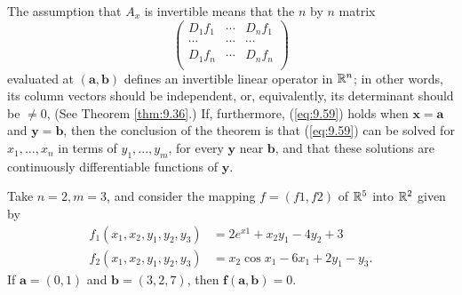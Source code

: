 The assumption that $A_x$ is invertible means that the $n$ by $n$ matrix
\begin{equation*}
    \begin{pmatrix}
        D_1 f_1 & \cdots & D_n f_1 \\
        \cdots  & \cdots & \cdots  \\
        D_1 f_n & \cdots & D_n f_n \\
    \end{pmatrix}
\end{equation*}
evaluated at $\mathbf{(a, b)}$ defines an invertible linear operator in ${\protect\mathbb R}^n$; 
in other words,
its column vectors should be independent, or, equivalently, its determinant
should be $\neq 0$, (See Theorem \ref{thm:9.36}.) 
If, furthermore, (\ref{eq:9.59}) holds when $\mathbf{x = a}$ and $\mathbf{y = b}$, 
then the conclusion of the theorem is that (\ref{eq:9.59}) 
can be solved for $x_1, \dots , x_n$
in terms of $y_1, ... , y_m$, for every $\mathbf{y}$ near $\mathbf{b}$, 
and that these solutions are continuously differentiable functions of $\mathbf{y}$.



\begin{myExample}
    Take $n = 2, m = 3$, and consider the mapping $f = (f1, f2)$ of
    ${\protect\mathbb R}^5$ into ${\protect\mathbb R}^2$ given by
    \begin{align*}
        f_1(x_1, x_2, y_1, y_2, y_3) &= 2 e^{x1} + x_2 y_1 - 4 y_2 + 3 \\
        f_2(x_1, x_2, y_1, y_2, y_3) &= x_2 \cos x_1 - 6 x_1 + 2 y_1 - y_3.
    \end{align*}
    If $\mathbf{a} = (0, 1)$ and $\mathbf{b} = (3, 2, 7)$, 
    then $\mathbf{f(a, b)} = 0$.

\end{myExample}